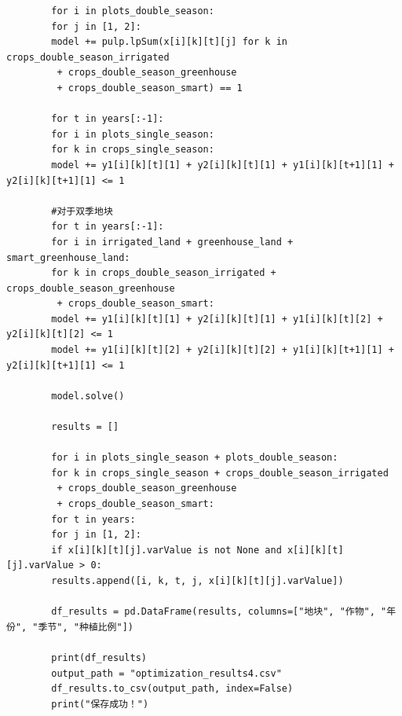 \documentclass[12pt]{ctexart}
\begin{document}
\begin{verbatim}
		for i in plots_double_season:
		for j in [1, 2]:
		model += pulp.lpSum(x[i][k][t][j] for k in crops_double_season_irrigated
		 + crops_double_season_greenhouse
		 + crops_double_season_smart) == 1
		
		for t in years[:-1]: 
		for i in plots_single_season:
		for k in crops_single_season:
		model += y1[i][k][t][1] + y2[i][k][t][1] + y1[i][k][t+1][1] + y2[i][k][t+1][1] <= 1
		
		#对于双季地块
		for t in years[:-1]: 
		for i in irrigated_land + greenhouse_land + smart_greenhouse_land:
		for k in crops_double_season_irrigated + crops_double_season_greenhouse
		 + crops_double_season_smart:
		model += y1[i][k][t][1] + y2[i][k][t][1] + y1[i][k][t][2] + y2[i][k][t][2] <= 1
		model += y1[i][k][t][2] + y2[i][k][t][2] + y1[i][k][t+1][1] + y2[i][k][t+1][1] <= 1
		
		model.solve()
		
		results = []
		
		for i in plots_single_season + plots_double_season:
		for k in crops_single_season + crops_double_season_irrigated
		 + crops_double_season_greenhouse
		 + crops_double_season_smart:
		for t in years:
		for j in [1, 2]:
		if x[i][k][t][j].varValue is not None and x[i][k][t][j].varValue > 0:
		results.append([i, k, t, j, x[i][k][t][j].varValue])
		
		df_results = pd.DataFrame(results, columns=["地块", "作物", "年份", "季节", "种植比例"])
		
		print(df_results)
		output_path = "optimization_results4.csv"
		df_results.to_csv(output_path, index=False)
		print("保存成功！")
	\end{verbatim}
	
\end{document}

